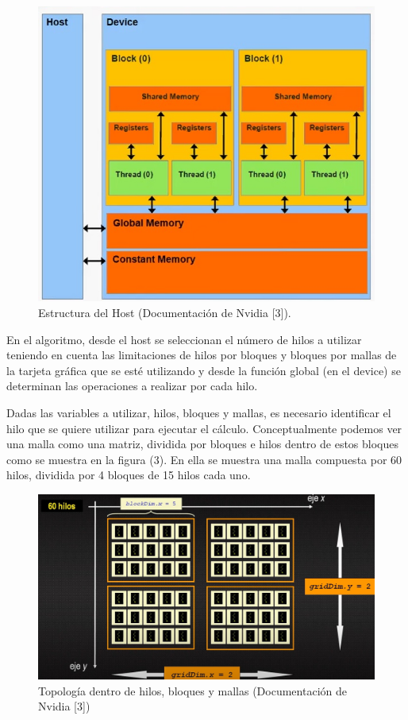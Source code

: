 \documentclass[11pt,a4paper,twoside,pdf]{article}
\numberwithin{equation}{section}
\begin{document}
\begin{figure}[h]
\centering
\includegraphics[width=10 cm]{Nvidia-Device_Structure.jpg}				
\caption{Estructura del Host (Documentación de Nvidia [3]). }
\end{figure}
\noindent

En el algoritmo, desde el host se seleccionan el número de hilos a utilizar teniendo en cuenta las limitaciones de hilos por bloques y bloques por mallas de la tarjeta gráfica que se esté utilizando y desde la función global (en el device) se determinan las operaciones a realizar por cada hilo. 

Dadas las variables a utilizar, hilos, bloques y mallas, es necesario identificar el hilo que se quiere utilizar para ejecutar el cálculo. Conceptualmente podemos ver una malla como una matriz, dividida por bloques e hilos dentro de estos bloques como se muestra en la figura (3). En ella se muestra una malla compuesta por 60 hilos, dividida por 4 bloques de 15 hilos cada uno.

\begin{figure}[h]
\centering
\includegraphics[width=10 cm]{Nvidia_Topologia_virtual.jpg}				
\caption{Topología dentro de hilos, bloques y mallas (Documentación de Nvidia [3]) }
\label{fig:topologia-hilos}
\end{figure}
\noindent
\end{document}
